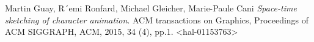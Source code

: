 \begin{thebibliography}{9}
    Martin Guay, R´emi Ronfard, Michael Gleicher, Marie-Paule Cani
    \textit{Space-time sketching of character animation}. 
    ACM transactions on Graphics, Proceedings of ACM SIGGRAPH, ACM,
    2015, 34 (4), pp.1. <hal-01153763>
 
\end{thebibliography}
